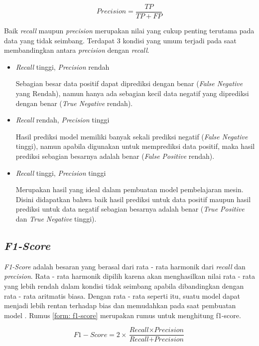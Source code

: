 \begin{equation}
  Precision = \frac{TP}{TP+FP}
  \label{form:precision}
\end{equation}

Baik \textit{recall} maupun \textit{precision} merupakan nilai yang cukup penting terutama pada data yang tidak seimbang. Terdapat 3 kondisi yang umum terjadi pada saat membandingkan antara \textit{precision} dengan \textit{recall}.

\begin{itemize}
  \item \textit{Recall} tinggi, \textit{Precision} rendah

        Sebagian besar data positif dapat diprediksi dengan benar (\textit{False Negative} yang Rendah), namun hanya ada sebagian kecil data negatif yang diprediksi dengan benar (\textit{True Negative} rendah).

  \item \textit{Recall} rendah, \textit{Precision} tinggi

        Hasil prediksi model memiliki banyak sekali prediksi negatif (\textit{False Negative} tinggi), namun apabila digunakan untuk memprediksi data positif, maka hasil prediksi sebagian besarnya adalah benar (\textit{False Positive} rendah).

  \item \textit{Recall} tinggi, \textit{Precision} tinggi

        Merupakan hasil yang ideal dalam pembuatan model pembelajaran mesin. Disini didapatkan bahwa baik hasil prediksi untuk data positif maupun hasil prediksi untuk data negatif sebagian besarnya adalah benar (\textit{True Positive} dan \textit{True Negative} tinggi).

\end{itemize}

\subsection{\textit{F1-Score}}

\textit{F1-Score} adalah besaran yang berasal dari rata - rata harmonik dari \textit{recall} dan \textit{precision}. Rata  - rata harmonik dipilih karena akan menghasilkan nilai rata - rata yang lebih rendah dalam kondisi tidak seimbang apabila dibandingkan dengan rata - rata aritmatis biasa. Dengan rata - rata seperti itu, suatu model dapat menjadi lebih rentan terhadap bias dan memudahkan pada saat pembuatan model \cite{metrics_ml}. Rumus \ref{form: f1-score} merupakan rumus untuk menghitung f1-score.

\begin{equation}
  \label{form: f1-score}
  F1-Score = 2 \times \frac{\textit{Recall} \times \textit{Precision}}{\textit{Recall} + \textit{Precision}}
\end{equation}